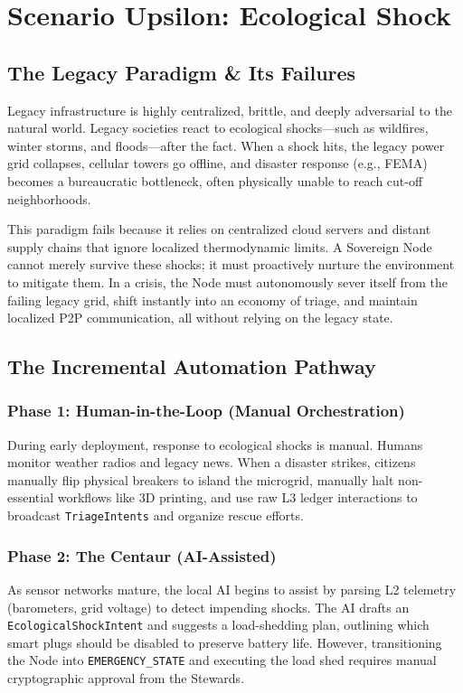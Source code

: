 \chapter{Scenario Upsilon: Ecological Shock}
\label{ch:scenario_upsilon}

\section{The Legacy Paradigm \& Its Failures}
Legacy infrastructure is highly centralized, brittle, and deeply adversarial to the natural world. Legacy societies react to ecological shocks—such as wildfires, winter storms, and floods—after the fact. When a shock hits, the legacy power grid collapses, cellular towers go offline, and disaster response (e.g., FEMA) becomes a bureaucratic bottleneck, often physically unable to reach cut-off neighborhoods.

This paradigm fails because it relies on centralized cloud servers and distant supply chains that ignore localized thermodynamic limits. A Sovereign Node cannot merely survive these shocks; it must proactively nurture the environment to mitigate them. In a crisis, the Node must autonomously sever itself from the failing legacy grid, shift instantly into an economy of triage, and maintain localized P2P communication, all without relying on the legacy state.

\section{The Incremental Automation Pathway}

\subsection{Phase 1: Human-in-the-Loop (Manual Orchestration)}
During early deployment, response to ecological shocks is manual. Humans monitor weather radios and legacy news. When a disaster strikes, citizens manually flip physical breakers to island the microgrid, manually halt non-essential workflows like 3D printing, and use raw L3 ledger interactions to broadcast \texttt{TriageIntents} and organize rescue efforts.

\subsection{Phase 2: The Centaur (AI-Assisted)}
As sensor networks mature, the local AI begins to assist by parsing L2 telemetry (barometers, grid voltage) to detect impending shocks. The AI drafts an \texttt{EcologicalShockIntent} and suggests a load-shedding plan, outlining which smart plugs should be disabled to preserve battery life. However, transitioning the Node into \texttt{EMERGENCY\_STATE} and executing the load shed requires manual cryptographic approval from the Stewards.

